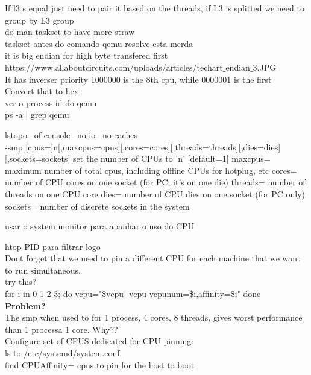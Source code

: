 \documentclass[11pt, a4paper, oneside]{article}
\theoremstyle{definition}
\begin{document}
If l3 s equal just need to pair it based on the threads, if L3 is splitted we need to group by L3 group\\
do man taskset to have more straw\\
taskset antes do comando qemu resolve esta merda\\
it is big endian for high byte transfered first\\
https://www.allaboutcircuits.com/uploads/articles/techart$\_$endian$\_$3.JPG\\
It has inverser priority 1000000 is the 8th cpu, while 0000001 is the first\\
Convert that to hex\\

ver o process id do qemu \\
ps -a | grep qemu

lstopo --of console --no-io --no-caches\\

-smp [cpus=]n[,maxcpus=cpus][,cores=cores][,threads=threads][,dies=dies][,sockets=sockets]
                set the number of CPUs to 'n' [default=1]
                maxcpus= maximum number of total cpus, including
                offline CPUs for hotplug, etc
                cores= number of CPU cores on one socket (for PC, it's on one die)
                threads= number of threads on one CPU core
                dies= number of CPU dies on one socket (for PC only)
                sockets= number of discrete sockets in the system

usar o system monitor para apanhar o uso do CPU

htop PID para filtrar logo \\

Dont forget that we need to pin a different CPU for each machine that we want to run simultaneous.\\

try this?\\
for i in 0 1 2 3; do
    vcpu="\$vcpu -vcpu vcpunum=\$i,affinity=\$i"
done\\

\textbf{Problem?}\\
The smp when used to for 1 process, 4 cores, 8 threads, gives worst performance than 1 processa 1 core. Why??\\

Configure set of CPUS dedicated for CPU pinning:\\
ls to /etc/systemd/system.conf\\
find CPUAffinity= cpus to pin for the host to boot\\
\end{document}
